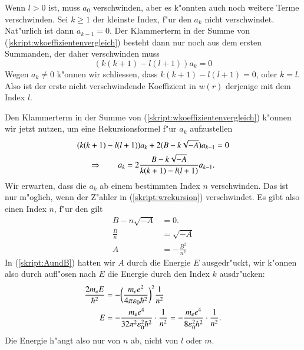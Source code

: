 Wenn $l>0$ ist, muss $a_0$ verschwinden, aber es k"onnten auch noch
weitere Terme verschwinden.
Sei $k\ge 1$ der kleinste Index, f"ur den $a_k$ nicht verschwindet.
Nat"urlich ist dann $a_{k-1}=0$.
Der Klammerterm in der Summe von (\ref{skript:wkoeffizientenvergleich})
besteht dann nur noch aus dem ersten Summanden, der daher verschwinden
muss
\[
(k(k+1)-l(l+1))a_k=0
\]
Wegen $a_k\ne 0$ k"onnen wir schliessen, dass $k(k+1)-l(l+1)=0$,
oder $k=l$.
Also ist der erste nicht verschwindende
Koeffizient in $w(r)$ derjenige mit dem Index $l$.

Den Klammerterm in der Summe von (\ref{skript:wkoeffizientenvergleich})
k"onnen wir jetzt nutzen, um eine Rekursionsformel f"ur $a_k$
aufzustellen
\begin{gather}
(k(k+1)-l(l+1))a_k+2(B-k\sqrt{-A})a_{k-1} =0
\notag
\\
\Rightarrow\qquad
a_k=2\frac{B-k\sqrt{-A}}{k(k+1)-l(l+1)} a_{k-1}.
\label{skript:wrekursion}
\end{gather}
Wir erwarten, dass die $a_k$ ab einem bestimmten Index $n$ verschwinden.
Das ist nur m"oglich, wenn der Z"ahler in (\ref{skript:wrekursion})
verschwindet. Es gibt also einen Index $n$, f"ur den gilt
\begin{align*}
B-n\sqrt{-A}&=0.
\\
\frac{B}{n}&=\sqrt{-A}
\\
A&=-\frac{B^2}{n^2}
\end{align*}
In (\ref{skript:AundB}) hatten wir $A$ durch die Energie $E$ ausgedr"uckt,
wir k"onnen also durch aufl"osen nach $E$ die Energie durch den Index $k$
ausdr"ucken:
\begin{align}
\frac{2m_eE}{\hbar^2}
&=
-
\biggl(
\frac{m_ee^2}{4\pi\varepsilon_0\hbar^2}
\biggr)^2
\frac{1}{n^2}
\notag
\\
E&=-\frac{m_e e^4}{32\pi^2\varepsilon_0^2\hbar^2}\cdot\frac{1}{n^2}
=-\frac{m_ee^4}{8\varepsilon_0^2h^2}\cdot\frac{1}{n^2}.
\label{skript:henergy}
\end{align}
Die Energie h"angt also nur von $n$ ab, nicht von $l$ oder $m$.


